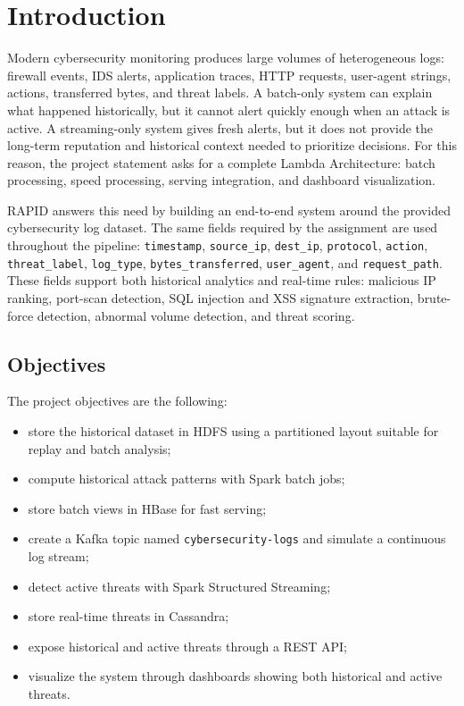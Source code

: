 \section{Introduction}
\label{sec:introduction}

Modern cybersecurity monitoring produces large volumes of heterogeneous logs: firewall events, IDS alerts, application traces, HTTP requests, user-agent strings, actions, transferred bytes, and threat labels. A batch-only system can explain what happened historically, but it cannot alert quickly enough when an attack is active. A streaming-only system gives fresh alerts, but it does not provide the long-term reputation and historical context needed to prioritize decisions. For this reason, the project statement asks for a complete Lambda Architecture: batch processing, speed processing, serving integration, and dashboard visualization.

RAPID answers this need by building an end-to-end system around the provided cybersecurity log dataset. The same fields required by the assignment are used throughout the pipeline: \texttt{timestamp}, \texttt{source\_ip}, \texttt{dest\_ip}, \texttt{protocol}, \texttt{action}, \texttt{threat\_label}, \texttt{log\_type}, \texttt{bytes\_transferred}, \texttt{user\_agent}, and \texttt{request\_path}. These fields support both historical analytics and real-time rules: malicious IP ranking, port-scan detection, SQL injection and XSS signature extraction, brute-force detection, abnormal volume detection, and threat scoring.

\subsection{Objectives}

The project objectives are the following:

\begin{itemize}
    \item store the historical dataset in HDFS using a partitioned layout suitable for replay and batch analysis;
    \item compute historical attack patterns with Spark batch jobs;
    \item store batch views in HBase for fast serving;
    \item create a Kafka topic named \texttt{cybersecurity-logs} and simulate a continuous log stream;
    \item detect active threats with Spark Structured Streaming;
    \item store real-time threats in Cassandra;
    \item expose historical and active threats through a REST API;
    \item visualize the system through dashboards showing both historical and active threats.
\end{itemize}

